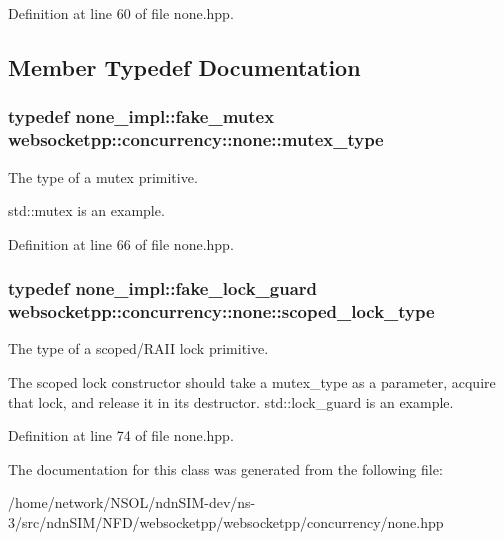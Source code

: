 Definition at line 60 of file none.\+hpp.



\subsection{Member Typedef Documentation}
\subsubsection[{\texorpdfstring{mutex\+\_\+type}{mutex\_type}}]{\setlength{\rightskip}{0pt plus 5cm}typedef {\bf none\+\_\+impl\+::fake\+\_\+mutex} {\bf websocketpp\+::concurrency\+::none\+::mutex\+\_\+type}}\hypertarget{classwebsocketpp_1_1concurrency_1_1none_a3cf002cfc62e64e920a91a06f5e6fbc3}{}\label{classwebsocketpp_1_1concurrency_1_1none_a3cf002cfc62e64e920a91a06f5e6fbc3}


The type of a mutex primitive. 

std\+::mutex is an example. 

Definition at line 66 of file none.\+hpp.

\subsubsection[{\texorpdfstring{scoped\+\_\+lock\+\_\+type}{scoped\_lock\_type}}]{\setlength{\rightskip}{0pt plus 5cm}typedef {\bf none\+\_\+impl\+::fake\+\_\+lock\+\_\+guard} {\bf websocketpp\+::concurrency\+::none\+::scoped\+\_\+lock\+\_\+type}}\hypertarget{classwebsocketpp_1_1concurrency_1_1none_af2d121eeb6202694819578ba4bb00d3e}{}\label{classwebsocketpp_1_1concurrency_1_1none_af2d121eeb6202694819578ba4bb00d3e}


The type of a scoped/\+R\+A\+II lock primitive. 

The scoped lock constructor should take a mutex\+\_\+type as a parameter, acquire that lock, and release it in its destructor. std\+::lock\+\_\+guard is an example. 

Definition at line 74 of file none.\+hpp.



The documentation for this class was generated from the following file\+:\begin{DoxyCompactItemize}
\item 
/home/network/\+N\+S\+O\+L/ndn\+S\+I\+M-\/dev/ns-\/3/src/ndn\+S\+I\+M/\+N\+F\+D/websocketpp/websocketpp/concurrency/none.\+hpp\end{DoxyCompactItemize}
